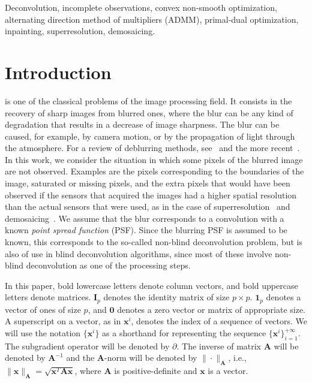 \documentclass[10pt,twocolumn,twoside]{IEEEtran}
\newcommand{\x}{\mathbf{x}} %
\newcommand{\A}{\mathbf{A}} %
\newcommand{\I}{\mathbf{I}} %
\begin{document}
\begin{IEEEkeywords}
Deconvolution, incomplete observations, convex non-smooth optimization, alternating direction method of multipliers (ADMM), primal-dual optimization, inpainting, superresolution, demosaicing.
\end{IEEEkeywords}






%
\IEEEpeerreviewmaketitle



\section{Introduction}
\label{sec:introduction}
 is one of the classical problems of the image processing field. It consists in the recovery of sharp images from blurred ones, where the blur can be any kind of degradation that results in a decrease of image sharpness. The blur can be caused, for example, by camera motion, or by the propagation of light through the atmosphere. For a review of deblurring methods, see~\cite{campisi2007} and the more recent~\cite{Rajagopalan2014}. In this work, we consider the situation in which some pixels of the blurred image are not observed. Examples are the pixels corresponding to the boundaries of the image, saturated or missing pixels, and the extra pixels that would have been observed if the sensors that acquired the images had a higher spatial resolution than the actual sensors that were used, as in the case of superresolution~\cite{Milanfar2010} and demosaicing~\cite{Lukac2008}. We assume that the blur corresponds to a convolution with a known \emph{point spread function} (PSF). Since the blurring PSF is assumed to be known, this corresponds to the so-called non-blind deconvolution problem, but is also of use in blind deconvolution algorithms, since most of these involve non-blind deconvolution as one of the processing steps.

In this paper, bold lowercase letters denote column vectors, and bold uppercase letters denote matrices. $\I_p$ denotes the identity matrix of size $p \times p$. $\mathbf 1_p$ denotes a vector of ones of size $p$, and $\mathbf 0$ denotes a zero vector or matrix of appropriate size. A superscript on a vector, as in $\x^i$, denotes the index of a sequence of vectors. We will use the notation $\{\x^i\}$ as a shorthand for representing the sequence $\{\x^i\}_{i=1}^{+\infty}$. The subgradient operator will be denoted by $\partial$. The inverse of matrix $\A$ will be denoted by $\A^{-1}$ and the $\A$-norm will be denoted by $\| \cdot \|_{\A}$, i.e., $\|\x\|_{\A} = \sqrt{\x^T \A \x}$, where $\A$ is positive-definite and $\x$ is a vector.
\end{document}
